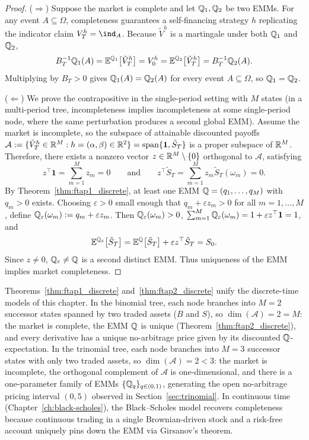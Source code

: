 \begin{proof}
($\Rightarrow$) Suppose the market is complete and let $\mathbb{Q}_1, \mathbb{Q}_2$ be two EMMs. For any event $A \subseteq \Omega$, completeness guarantees a self-financing strategy $h$ replicating the indicator claim $V_T^h = \ind_A$. Because $\tilde{V}^h$ is a martingale under both $\mathbb{Q}_1$ and $\mathbb{Q}_2$,
\[
    B_T^{-1} \mathbb{Q}_1(A) = \mathbb{E}^{\mathbb{Q}_1}\bigl[\tilde{V}_T^h\bigr] = V_0^h = \mathbb{E}^{\mathbb{Q}_2}\bigl[\tilde{V}_T^h\bigr] = B_T^{-1} \mathbb{Q}_2(A).
\]
Multiplying by $B_T > 0$ gives $\mathbb{Q}_1(A) = \mathbb{Q}_2(A)$ for every event $A \subseteq \Omega$, so $\mathbb{Q}_1 = \mathbb{Q}_2$.

($\Leftarrow$) We prove the contrapositive in the single-period setting with $M$ states (in a multi-period tree, incompleteness implies incompleteness at some single-period node, where the same perturbation produces a second global EMM). Assume the market is incomplete, so the subspace of attainable discounted payoffs $\mathcal{A} := \{\tilde{V}_T^h \in \mathbb{R}^M : h = (\alpha, \beta) \in \mathbb{R}^2\} = \operatorname{span}\{\mathbf{1}, \tilde{S}_T\}$ is a proper subspace of $\mathbb{R}^M$. Therefore, there exists a nonzero vector $z \in \mathbb{R}^M \setminus \{0\}$ orthogonal to $\mathcal{A}$, satisfying
\[
    z^\top \mathbf{1} = \sum_{m=1}^{M} z_m = 0 \qquad \text{and} \qquad z^\top \tilde{S}_T = \sum_{m=1}^{M} z_m \tilde{S}_T(\omega_m) = 0.
\]
By Theorem~\ref{thm:ftap1_discrete}, at least one EMM $\mathbb{Q} = (q_1, \dots, q_M)$ with $q_m > 0$ exists. Choosing $\varepsilon > 0$ small enough that $q_m + \varepsilon z_m > 0$ for all $m = 1, \dots, M$, define $\mathbb{Q}_\varepsilon(\omega_m) := q_m + \varepsilon z_m$. Then $\mathbb{Q}_\varepsilon(\omega_m) > 0$, $\sum_{m=1}^{M} \mathbb{Q}_\varepsilon(\omega_m) = 1 + \varepsilon z^\top \mathbf{1} = 1$, and
\[
    \mathbb{E}^{\mathbb{Q}_\varepsilon}\bigl[\tilde{S}_T\bigr] = \mathbb{E}^{\mathbb{Q}}\bigl[\tilde{S}_T\bigr] + \varepsilon z^\top \tilde{S}_T = S_0.
\]
Since $z \neq 0$, $\mathbb{Q}_\varepsilon \neq \mathbb{Q}$ is a second distinct EMM. Thus uniqueness of the EMM implies market completeness.
\end{proof}

Theorems~\ref{thm:ftap1_discrete} and~\ref{thm:ftap2_discrete} unify the discrete-time models of this chapter. In the binomial tree, each node branches into $M = 2$ successor states spanned by two traded assets ($B$ and $S$), so $\dim(\mathcal{A}) = 2 = M$: the market is complete, the EMM $\mathbb{Q}$ is unique (Theorem~\ref{thm:ftap2_discrete}), and every derivative has a unique no-arbitrage price given by its discounted $\mathbb{Q}$-expectation. In the trinomial tree, each node branches into $M = 3$ successor states with only two traded assets, so $\dim(\mathcal{A}) = 2 < 3$: the market is incomplete, the orthogonal complement of $\mathcal{A}$ is one-dimensional, and there is a one-parameter family of EMMs $\{\mathbb{Q}_q\}_{q \in (0, 1)}$, generating the open no-arbitrage pricing interval $(0, 5)$ observed in Section~\ref{sec:trinomial}. In continuous time (Chapter~\ref{ch:black-scholes}), the Black--Scholes model recovers completeness because continuous trading in a single Brownian-driven stock and a risk-free account uniquely pins down the EMM via Girsanov's theorem.
